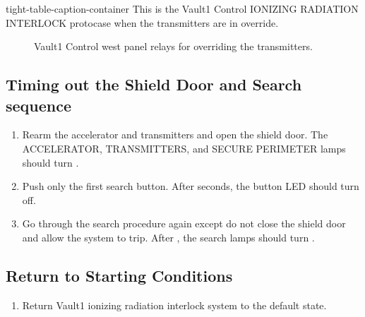 \documentclass[letterpaper,10pt,english]{sphinxmanual}
\begin{document}
\begin{sphinxuseclass}{tight-table-caption-container}
\sphinxAtStartPar
{} This is the Vault\sphinxhyphen{}1 Control IONIZING RADIATION INTERLOCK protocase when the transmitters are in override.

\end{sphinxuseclass}
\begin{figure}[htbp]
\centering
\capstart

\noindent{}
\caption{ Vault\sphinxhyphen{}1 Control west panel relays for overriding the transmitters.}\label{\detokenize{testing_documentation/Vault-1_ionizing_radiation:id8}}\end{figure}


\subsection{Timing out the Shield Door and Search sequence}
\label{\detokenize{testing_documentation/Vault-1_ionizing_radiation:timing-out-the-shield-door-and-search-sequence}}\begin{enumerate}
%
\item {} 
\sphinxAtStartPar
Rearm the accelerator and transmitters and open the shield door.
The ACCELERATOR, TRANSMITTERS, and SECURE PERIMETER lamps should turn .

\item {} 
\sphinxAtStartPar
Push only the first search button.
After  seconds, the button LED should turn off.

\item {} 
\sphinxAtStartPar
Go through the search procedure again except do not close the shield door and allow the system to trip.
After , the search lamps should turn .

\end{enumerate}


\subsection{Return to Starting Conditions}
\label{\detokenize{testing_documentation/Vault-1_ionizing_radiation:return-to-starting-conditions}}\begin{enumerate}
%
\item {} 
\sphinxAtStartPar
Return Vault\sphinxhyphen{}1 ionizing radiation interlock system to the default state.

\end{enumerate}
\end{document}
